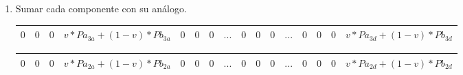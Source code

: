 \begin{enumerate}
Multiplicar los componentes de píxel correspondientes a B por 1-v. Preparamos un registro con cuatro dwords de valor 1-v (como hicimos previamente) para poder multiplicar ambos registros y obtener como resultado lo siguiente:

\begin{tabular}{| g | g | g | g | g | g | g | g | g | g | g | g | g | g | g | g |}
\hline
$0$ & $0$ & $0$ & $(1-v) * Pb_{3a}$ & $0$ & $0$ & $0$ & $(1-v) * Pb_{3b}$ & $0$ & $0$ & $0$ & $(1-v) * Pb_{3c}$ & $0$ & $0$ & $0$ & $(1-v) * Pb_{3d}$ \\ 
\hline
\end{tabular}

\begin{tabular}{| g | g | g | g | g | g | g | g | g | g | g | g | g | g | g | g |}
\hline
$0$ & $0$ & $0$ & $(1-v) * Pb_{2a}$ & $0$ & $0$ & $0$ & $(1-v) * Pb_{2b}$ & $0$ & $0$ & $0$ & $(1-v) * Pb_{2c}$ & $0$ & $0$ & $0$ & $(1-v) * Pb_{2d}$ \\ 
\hline
\end{tabular}

\begin{tabular}{| g | g | g | g | g | g | g | g | g | g | g | g | g | g | g | g |}
\hline
$0$ & $0$ & $0$ & $(1-v) * Pb_{1a}$ & $0$ & $0$ & $0$ & $(1-v) * Pb_{1b}$ & $0$ & $0$ & $0$ & $(1-v) * Pb_{1c}$ & $0$ & $0$ & $0$ & $(1-v) * Pb_{1d}$\\ 
\hline
\end{tabular}

\begin{tabular}{| g | g | g | g | g | g | g | g | g | g | g | g | g | g | g | g |}
\hline
$0$ & $0$ & $0$ & $(1-v) * Pb_{0a}$ & $0$ & $0$ & $0$ & $(1-v) * Pb_{0b}$ & $0$ & $0$ & $0$ & $(1-v) * Pb_{0c}$ & $0$ & $0$ & $0$ & $(1-v) * Pb_{0d}$ \\ 
\hline
\end{tabular}

\item Sumar cada componente con su análogo. \\
\footnotesize
\begin{tabular}{| o | o | o | o | o | o | o | o | o | o | o | o | o | o | o | o |} %
\hline
$0$ & $0$ & $0$ & $v * Pa_{3a} + (1-v) * Pb_{3a}$ & $0$ & $0$ & $0$ & $...$ & $0$ & $0$ & $0$ & $...$ & $0$ & $0$ & $0$ & $v * Pa_{3d} + (1-v) * Pb_{3d}$ \\ 
\hline
\end{tabular}

\begin{tabular}{| o | o | o | o | o | o | o | o | o | o | o | o | o | o | o | o |} %
\hline
$0$ & $0$ & $0$ & $v * Pa_{2a} + (1-v) * Pb_{2a}$ & $0$ & $0$ & $0$ & $...$ & $0$ & $0$ & $0$ & $...$ & $0$ & $0$ & $0$ & $v * Pa_{2d} + (1-v) * Pb_{2d}$ \\ 
\hline
\end{tabular}


\end{enumerate}
